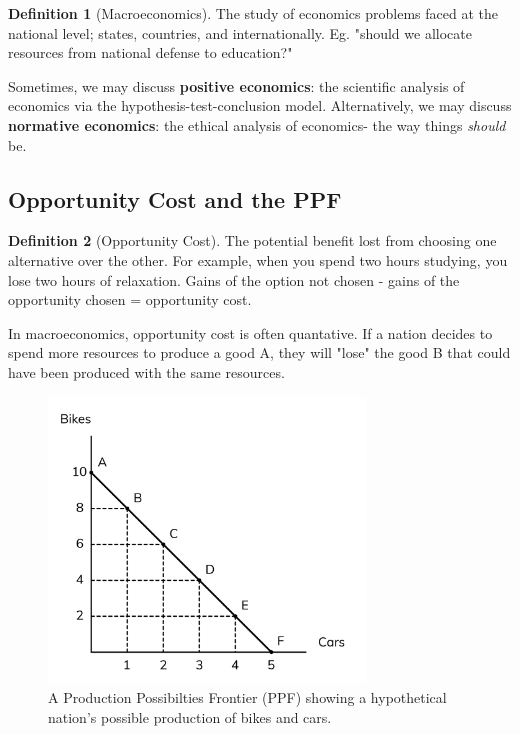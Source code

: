 \documentclass[12pt, a4paper]{article}
\theoremstyle{definition}
\newtheorem{definition}{Definition}
\begin{document}
\begin{definition}[Macroeconomics]
    The study of economics problems faced at the national level; states, countries, and internationally.
    Eg. "should we allocate resources from national defense to education?"
\end{definition}

Sometimes, we may discuss \textbf{positive economics}: the scientific analysis of economics via the hypothesis-test-conclusion model.
Alternatively, we may discuss \textbf{normative economics}: the ethical analysis of economics- the way things \textit{should} be.

\subsection{Opportunity Cost and the PPF}

\begin{definition}[Opportunity Cost]
    The potential benefit lost from choosing one alternative over the other.
    For example, when you spend two hours studying, you lose two hours of relaxation.    
    Gains of the option not chosen - gains of the opportunity chosen = opportunity cost.
\end{definition}

In macroeconomics, opportunity cost is often quantative.
If a nation decides to spend more resources to produce a good A, they will "lose" the good B that could have been produced with the same resources.

\begin{figure}[ht] %
    \centering
    \includegraphics[width=0.75\textwidth]{ppf.png}
    \caption{A Production Possibilties Frontier (PPF) showing a hypothetical nation's possible production of bikes and cars.}
    \label{fig:ppf}
\end{figure}
\end{document}
